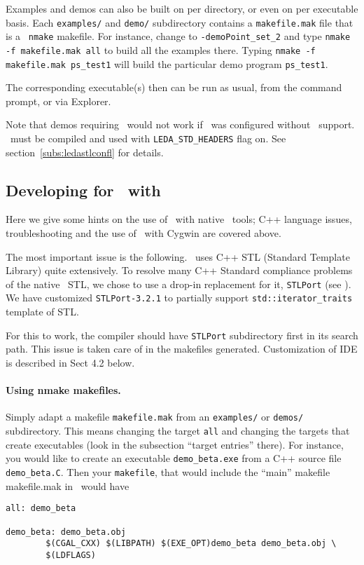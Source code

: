Examples and demos can also be built on per directory, or even on per
executable basis.  Each \texttt{examples/} and \texttt{demo/}
subdirectory contains a \texttt{makefile.mak} file that is a \mswin\ 
\texttt{nmake} makefile.  For instance, change to
\texttt{\cgal-\cgalrelease\bslsh demo\bslsh Point\_set\_2} and type
\texttt{nmake -f makefile.mak all} to build all the examples there.
Typing \texttt{nmake -f makefile.mak ps\_test1} will build the
particular demo program \texttt{ps\_test1}.

The corresponding executable(s) then can be run as usual, from the
command prompt, or via Explorer.

Note that demos requiring \leda\ would not work if \cgal\ was
configured without \leda\ support.  \leda\ must be compiled and used
with \texttt{LEDA\_STD\_HEADERS} flag on. See
section~\ref{subs:ledastlconfl} for details.


\subsection{Developing for \cgal\ with }

Here we give some hints on the use of \cgal\ with native \msvc\ tools;
C++ language issues, troubleshooting and the use of \cgal\ with Cygwin
are covered above.

The most important issue is the following. \cgal\ uses C++ STL
(Standard Template Library) quite extensively.  To resolve many C++
Standard compliance problems of the native \msvc\ STL, we chose to use
a drop-in replacement for it, \texttt{STLPort} (see \stlportpage). We
have customized \texttt{STLPort-3.2.1} to partially support
\texttt{std::iterator\_traits} template of STL.

For this to work, the compiler should have \texttt{STLPort}
subdirectory first in its search path.  This issue is taken care of in
the makefiles generated.  Customization of IDE is described in Sect
4.2 below.


\paragraph{Using nmake makefiles.}
Simply adapt a makefile \texttt{makefile.mak} 
from an \texttt{examples/} or \texttt{demos/} subdirectory.
This means changing the target \texttt{all} and changing the targets that
create executables (look in the subsection ``target entries'' there).
For instance, you would like to create an executable \texttt{demo\_beta.exe}
from a C++ source file \texttt{demo\_beta.C}.  Then your 
\texttt{makefile}, that would
include the ``main'' makefile makefile.mak in \CGALR\ would have
\begin{verbatim}
all: demo_beta

demo_beta: demo_beta.obj
        $(CGAL_CXX) $(LIBPATH) $(EXE_OPT)demo_beta demo_beta.obj \
        $(LDFLAGS)
\end{verbatim}

